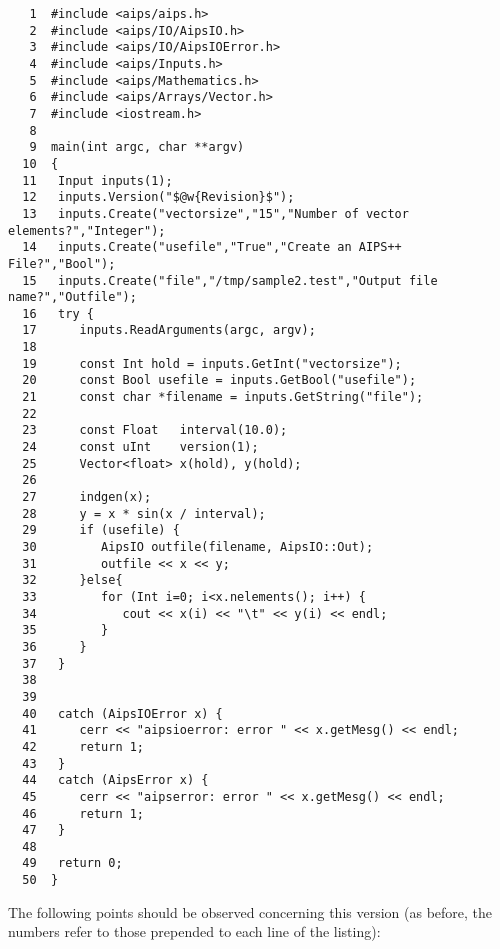 \begin{verbatim}
   1  #include <aips/aips.h>
   2  #include <aips/IO/AipsIO.h>
   3  #include <aips/IO/AipsIOError.h>
   4  #include <aips/Inputs.h>
   5  #include <aips/Mathematics.h>
   6  #include <aips/Arrays/Vector.h>
   7  #include <iostream.h>
   8
   9  main(int argc, char **argv)
  10  {
  11   Input inputs(1);
  12   inputs.Version("$@w{Revision}$");
  13   inputs.Create("vectorsize","15","Number of vector elements?","Integer");
  14   inputs.Create("usefile","True","Create an AIPS++ File?","Bool");
  15   inputs.Create("file","/tmp/sample2.test","Output file name?","Outfile");
  16   try {
  17      inputs.ReadArguments(argc, argv);
  18
  19      const Int hold = inputs.GetInt("vectorsize");
  20      const Bool usefile = inputs.GetBool("usefile");
  21      const char *filename = inputs.GetString("file");
  22
  23      const Float   interval(10.0);
  24      const uInt    version(1);
  25      Vector<float> x(hold), y(hold);
  26
  27      indgen(x);
  28      y = x * sin(x / interval);
  29      if (usefile) {
  30         AipsIO outfile(filename, AipsIO::Out);
  31         outfile << x << y;
  32      }else{
  33         for (Int i=0; i<x.nelements(); i++) {
  34            cout << x(i) << "\t" << y(i) << endl;
  35         }
  36      }
  37   }
  38
  39
  40   catch (AipsIOError x) {
  41      cerr << "aipsioerror: error " << x.getMesg() << endl;
  42      return 1;
  43   }
  44   catch (AipsError x) {
  45      cerr << "aipserror: error " << x.getMesg() << endl;
  46      return 1;
  47   }
  48
  49   return 0;
  50  }

\end{verbatim}

The following points should be observed concerning this version (as
before, the numbers refer to those prepended to each line of
the listing):

